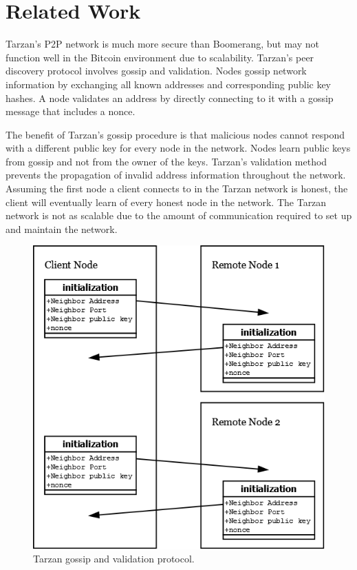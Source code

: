 \section{Related Work}
Tarzan's P2P network is much more secure than Boomerang, but may not function well in the Bitcoin environment due to scalability. Tarzan's peer discovery protocol involves gossip and validation. Nodes gossip network information by exchanging all known addresses and corresponding public key hashes. A node validates an address by directly connecting to it with a gossip message that includes a nonce.

The benefit of Tarzan's gossip procedure is that malicious nodes cannot respond with a different public key for every node in the network. Nodes learn public keys from gossip and not from the owner of the keys. Tarzan's validation method prevents the propagation of invalid address information throughout the network. Assuming the first node a client connects to in the Tarzan network is honest, the client will eventually learn of every honest node in the network. The Tarzan network is not as scalable due to the amount of communication required to set up and maintain the network.

\begin{figure}[ht!]
\begin{center}
\includegraphics[scale=0.3]{./images/tarzan_protocol.png}
\caption{Tarzan gossip and validation protocol.}
\label{fig:tarzan_protocol}
\end{center}
\end{figure}

